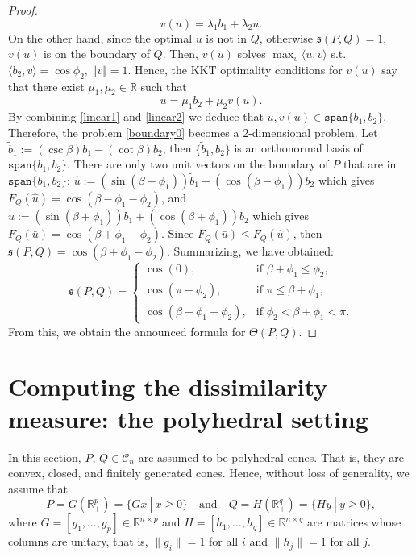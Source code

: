 \documentclass[hidelinks,onefignum,onetabnum]{siamart250211}
\theoremstyle{definition}
\theoremstyle{remark}
\newcommand{\R}{\mathbb R}
\newcommand{\bu}{\bar{u}}
\begin{document}
\begin{proof}
\begin{equation}\label{linear1}
v(u)=\lambda_1 b_1+\lambda_2 u.
\end{equation}
On the other hand, since the optimal $u$ is not in $Q$, otherwise $\mathfrak{s}(P,Q)=1$, $v(u)$ is on the boundary of $Q$. Then, $v(u)$ solves $\max_v\langle u,v\rangle$ s.t. $\langle b_2, v\rangle=\cos \phi_2,\;\Vert v\Vert=1$. Hence, the KKT optimality conditions for $v(u)$ say that there exist $\mu_1,\mu_2\in\R$ such that 
\begin{equation}\label{linear2}
u=\mu_1 b_2+\mu_2 v(u).
\end{equation}
By combining \eqref{linear1} and \eqref{linear2} we deduce that $u,v(u)\in\mathtt{span}\{b_1,b_2\}$. Therefore, the problem \eqref{boundary0} becomes a 2-dimensional problem. Let $\tilde b_1:=(\csc\beta) b_1-(\cot\beta)b_2$, then $\{\tilde b_1,b_2\}$ is an orthonormal basis of $\mathtt{span}\{b_1,b_2\}$. There are only two unit vectors on the boundary of $P$ that are in $\mathtt{span}\{b_1,b_2\}$: $\hat u:=(\sin(\beta-\phi_1))\tilde b_1+(\cos(\beta-\phi_1))b_2$ which gives $F_Q(\hat u)=\cos(\beta-\phi_1-\phi_2)$, and $\bu:=(\sin(\beta+\phi_1))\tilde b_1+(\cos(\beta+\phi_1))b_2$ which gives $F_Q(\bu)=\cos(\beta+\phi_1-\phi_2)$. Since $F_Q(\bu)\leq F_Q(\hat u)$, then  $\mathfrak{s}(P,Q)=\cos(\beta+\phi_1-\phi_2)$.
Summarizing, we have obtained:
\[\mathfrak{s}(P,Q)=
\begin{cases}
\cos(0),&\text{if }\beta+\phi_1\leq\phi_2,\\
\cos(\pi-\phi_2),&\text{if }\pi\leq\beta+\phi_1,\\
\cos(\beta+\phi_1-\phi_2),&\text{if }\phi_2<\beta+\phi_1<\pi.
\end{cases}
\]
From this, we obtain the announced formula for $\Theta(P,Q)$.
\end{proof}



\section{Computing the dissimilarity measure: the polyhedral setting}\label{sec:poly}


In this section, $P,\,Q\in\mathcal C_n$ are assumed to be polyhedral cones. That is, they are convex, closed, and finitely generated cones. Hence, without loss of generality, we assume that
\begin{equation}\label{polyhedral}
P=G (\mathbb R^p_+) = \{ Gx \ | \ x \geq 0 \} 
\quad \mbox{and} \quad 
Q=H (\mathbb R^q_+)  = \{ Hy \ | \ y \geq 0 \}, 
\end{equation}
where $G=[g_1,\ldots,g_p]\in\R^{n\times p}$ and $H=[h_1,\ldots,h_q]\in\R^{n\times q}$ are matrices whose columns 
are unitary, that is, $\|g_i\| = 1$ for all $i$ and $\|h_j\| = 1$ for all $j$. 
\end{document}
